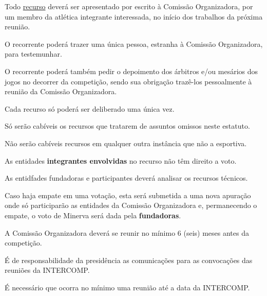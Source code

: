 \begin{article}
	Todo \underline{recurso} deverá ser apresentado por escrito à Comissão Organizadora, por um membro da atlética integrante interessada, no início dos trabalhos da próxima reunião.

	\begin{xparagraph}
		O recorrente poderá trazer uma única pessoa, estranha à Comissão Organizadora, para testemunhar.
	\end{xparagraph}

	\begin{xparagraph}
		O recorrente poderá também pedir o depoimento dos árbitros e/ou mesários dos jogos no decorrer da competição, sendo sua obrigação trazê-los pessoalmente à reunião da Comissão Organizadora.
	\end{xparagraph}

	\begin{xparagraph}
		Cada recurso só poderá ser deliberado uma única vez.
	\end{xparagraph}

	\begin{xparagraph}
		Só serão cabíveis os recursos que tratarem de assuntos omissos neste estatuto.
	\end{xparagraph}

	\begin{xparagraph}
		Não serão cabíveis recursos em qualquer outra instância que não a esportiva.
	\end{xparagraph}

	\begin{xparagraph}
		As entidades \textbf{integrantes envolvidas} no recurso não têm direito a voto.
	\end{xparagraph}

	\begin{xparagraph}
		As entidfades fundadoras e participantes deverá analisar os recursos técnicos.
	\end{xparagraph}

	\begin{xparagraph}
		Caso haja empate em uma votação, esta será submetida a uma nova apuração onde só participarão as entidades da Comissão Organizadora e, permanecendo o empate, o voto de Minerva será dada pela \textbf{fundadoras}.
	\end{xparagraph}
\end{article}

\begin{article}
	A Comissão Organizadora deverá se reunir no mínimo 6 (seis) meses antes da competição.

	\begin{xparagraph}
		É de responsabilidade da presidência as comunicações para as convocações das reuniões da INTERCOMP.
	\end{xparagraph}

	\begin{xparagraph}
		É necessário que ocorra no mínimo uma reunião até a data da INTERCOMP.
	\end{xparagraph}
\end{article}

